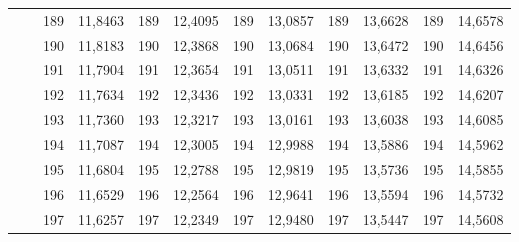 \documentclass[a4paper,12pt]{article} %
\begin{document}
\begin{longtable}[c]{cccccccccc|c|c|}
	& \multicolumn{1}{c|}{} & \multicolumn{1}{c|}{189} & \multicolumn{1}{c|}{11,8463} & \multicolumn{1}{c|}{189} & \multicolumn{1}{c|}{12,4095} & \multicolumn{1}{c|}{189} & \multicolumn{1}{c|}{13,0857} & \multicolumn{1}{c|}{189} & 13,6628 & 189 & 14,6578 \\ \cline{3-12} 
	& \multicolumn{1}{c|}{} & \multicolumn{1}{c|}{190} & \multicolumn{1}{c|}{11,8183} & \multicolumn{1}{c|}{190} & \multicolumn{1}{c|}{12,3868} & \multicolumn{1}{c|}{190} & \multicolumn{1}{c|}{13,0684} & \multicolumn{1}{c|}{190} & 13,6472 & 190 & 14,6456 \\ \cline{3-12} 
	& \multicolumn{1}{c|}{} & \multicolumn{1}{c|}{191} & \multicolumn{1}{c|}{11,7904} & \multicolumn{1}{c|}{191} & \multicolumn{1}{c|}{12,3654} & \multicolumn{1}{c|}{191} & \multicolumn{1}{c|}{13,0511} & \multicolumn{1}{c|}{191} & 13,6332 & 191 & 14,6326 \\ \cline{3-12} 
	& \multicolumn{1}{c|}{} & \multicolumn{1}{c|}{192} & \multicolumn{1}{c|}{11,7634} & \multicolumn{1}{c|}{192} & \multicolumn{1}{c|}{12,3436} & \multicolumn{1}{c|}{192} & \multicolumn{1}{c|}{13,0331} & \multicolumn{1}{c|}{192} & 13,6185 & 192 & 14,6207 \\ \cline{3-12} 
	& \multicolumn{1}{c|}{} & \multicolumn{1}{c|}{193} & \multicolumn{1}{c|}{11,7360} & \multicolumn{1}{c|}{193} & \multicolumn{1}{c|}{12,3217} & \multicolumn{1}{c|}{193} & \multicolumn{1}{c|}{13,0161} & \multicolumn{1}{c|}{193} & 13,6038 & 193 & 14,6085 \\ \cline{3-12} 
	& \multicolumn{1}{c|}{} & \multicolumn{1}{c|}{194} & \multicolumn{1}{c|}{11,7087} & \multicolumn{1}{c|}{194} & \multicolumn{1}{c|}{12,3005} & \multicolumn{1}{c|}{194} & \multicolumn{1}{c|}{12,9988} & \multicolumn{1}{c|}{194} & 13,5886 & 194 & 14,5962 \\ \cline{3-12} 
	& \multicolumn{1}{c|}{} & \multicolumn{1}{c|}{195} & \multicolumn{1}{c|}{11,6804} & \multicolumn{1}{c|}{195} & \multicolumn{1}{c|}{12,2788} & \multicolumn{1}{c|}{195} & \multicolumn{1}{c|}{12,9819} & \multicolumn{1}{c|}{195} & 13,5736 & 195 & 14,5855 \\ \cline{3-12} 
	& \multicolumn{1}{c|}{} & \multicolumn{1}{c|}{196} & \multicolumn{1}{c|}{11,6529} & \multicolumn{1}{c|}{196} & \multicolumn{1}{c|}{12,2564} & \multicolumn{1}{c|}{196} & \multicolumn{1}{c|}{12,9641} & \multicolumn{1}{c|}{196} & 13,5594 & 196 & 14,5732 \\ \cline{3-12} 
	& \multicolumn{1}{c|}{} & \multicolumn{1}{c|}{197} & \multicolumn{1}{c|}{11,6257} & \multicolumn{1}{c|}{197} & \multicolumn{1}{c|}{12,2349} & \multicolumn{1}{c|}{197} & \multicolumn{1}{c|}{12,9480} & \multicolumn{1}{c|}{197} & 13,5447 & 197 & 14,5608 \\ \cline{3-12} 

\end{longtable}
\end{document}

